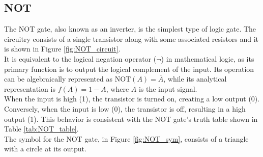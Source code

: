 \subsection{NOT}
    The NOT gate, also known as an inverter, is the simplest type of logic gate. 
    The circuitry consists of a single transistor along with some associated resistors and it is shown in Figure \ref{fig:NOT_circuit}. \\
    It is equivalent to the logical negation operator ($\neg$) in mathematical logic, as its primary function is to output the logical complement of the input.
    Its operation can be algebraically represented as $\text{NOT}(A) = \overline{A}$, while its analytical representation is $f(A)=1-A$, where $A$ is the input signal. \\
    When the input is high (1), the transistor is turned on, creating a low output (0). 
    Conversely, when the input is low (0), the transistor is off, resulting in a high output (1).
    This behavior is consistent with the NOT gate's truth table shown in Table \ref{tab:NOT_table}. \\
    The symbol for the NOT gate, in Figure \ref{fig:NOT_sym}, consists of a triangle with a circle at its output.

